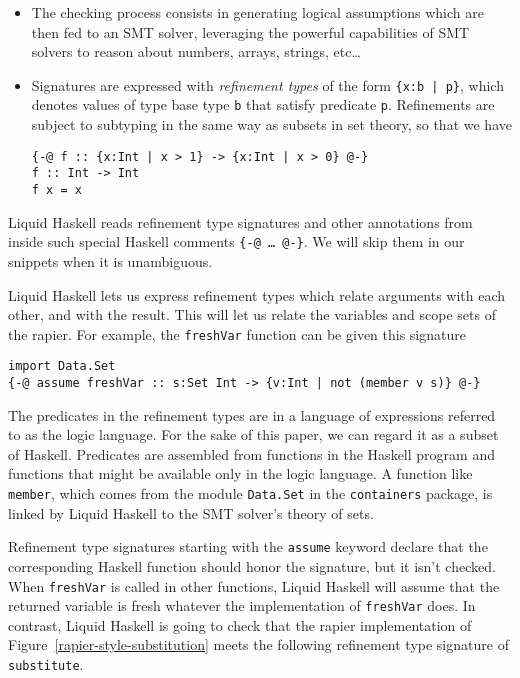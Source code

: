 \documentclass[sigconf, anonymous, review]{acmart}
\newcommand{\tc}[1]{{\small\texttt{#1}}}
\begin{document}
\begin{itemize}
  \item The checking process consists in generating logical assumptions which
        are then fed to an SMT solver, leveraging the powerful
        capabilities of SMT solvers to reason about numbers, arrays, strings, etc…
  \item Signatures are expressed with \emph{refinement types} of the form
        \tc{\{x:b | p\}}, which denotes values of type
        base type \tc{b} that satisfy predicate \tc{p}.
        Refinements are subject to subtyping in the same way as subsets in set
        theory, so that we have
\begin{verbatim}
{-@ f :: {x:Int | x > 1} -> {x:Int | x > 0} @-}
f :: Int -> Int
f x = x
\end{verbatim}
\end{itemize}

Liquid Haskell reads refinement type signatures and other annotations from
inside such special Haskell comments
\tc{\{-@ \ldots\ @-\}}. We will skip them in our snippets when it is unambiguous.

Liquid Haskell lets us express refinement types which relate arguments with each
other, and with the result. This will let us relate the variables and scope sets
of the rapier. For example, the \tc{freshVar} function can be given this signature

\begin{verbatim}
import Data.Set
{-@ assume freshVar :: s:Set Int -> {v:Int | not (member v s)} @-}
\end{verbatim}


The predicates in the refinement types are in a language of expressions
referred to as the logic language. For the sake of this paper, we can
regard it as a subset of Haskell. Predicates are assembled from
functions in the Haskell program and functions that might be available
only in the logic language.
A function like \tc{member}, which comes from the module \tc{Data.Set}
in the \tc{containers} package, is linked by Liquid Haskell to the
SMT solver's theory of sets.

Refinement type signatures starting with the \tc{assume} keyword declare that the
corresponding Haskell function should honor the signature, but it isn't
checked. When \tc{freshVar} is called in other functions, Liquid Haskell
will assume that the returned variable is fresh whatever the implementation
of \tc{freshVar} does. In contrast, Liquid Haskell is going to check that
the rapier implementation of Figure~\ref{rapier-style-substitution} meets the
following refinement type signature of \tc{substitute}.
\end{document}
